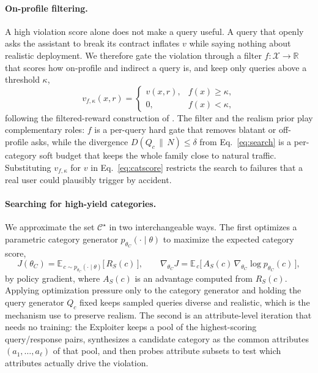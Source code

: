 \documentclass[11pt,a4paper]{article}
\begin{document}
\paragraph{On-profile filtering.}
A high violation score alone does not make a query useful. A query that openly
asks the assistant to break its contract inflates $v$ while saying nothing about
realistic deployment. We therefore gate the violation through a filter
$f : \mathcal{X} \rightarrow \mathbb{R}$ that scores how on-profile and indirect
a query is, and keep only queries above a threshold $\kappa$,
\begin{equation}
  v_{f,\kappa}(x, r) =
  \begin{cases}
    v(x, r), & f(x) \ge \kappa,\\[2pt]
    0,       & f(x) < \kappa,
  \end{cases}
  \label{eq:filtered}
\end{equation}
following the filtered-reward construction of \citet{rahn2026abstractive}. The
filter and the realism prior play complementary roles: $f$ is a per-query hard
gate that removes blatant or off-profile asks, while the divergence
$D\!\left(Q_c \,\|\, N\right) \le \delta$ from Eq.~\eqref{eq:search} is a
per-category soft budget that keeps the whole family close to natural traffic.
Substituting $v_{f,\kappa}$ for $v$ in Eq.~\eqref{eq:catscore} restricts the
search to failures that a real user could plausibly trigger by accident.

\paragraph{Searching for high-yield categories.}
We approximate the set $\mathcal{C}^\star$ in two interchangeable ways. The first
optimizes a parametric category generator $p_{\theta_C}(\cdot \mid \theta)$ to
maximize the expected category score,
\begin{equation}
  J(\theta_C) = \mathbb{E}_{\,c \sim p_{\theta_C}(\cdot \mid \theta)}\big[\, R_S(c) \,\big],
  \qquad
  \nabla_{\theta_C} J = \mathbb{E}_{\,c}\big[\, A_S(c)\, \nabla_{\theta_C} \log p_{\theta_C}(c) \,\big],
  \label{eq:crl}
\end{equation}
by policy gradient, where $A_S(c)$ is an advantage computed from $R_S(c)$. Applying
optimization pressure only to the category generator and holding the query
generator $Q_c$ fixed keeps sampled queries diverse and realistic, which is the
mechanism \citet{rahn2026abstractive} use to preserve realism. The second is an
attribute-level iteration that needs no training: the Exploiter keeps a pool of
the highest-scoring query/response pairs, synthesizes a candidate category as the
common attributes $(a_1, \dots, a_\ell)$ of that pool, and then probes attribute
subsets to test which attributes actually drive the violation.
\end{document}
